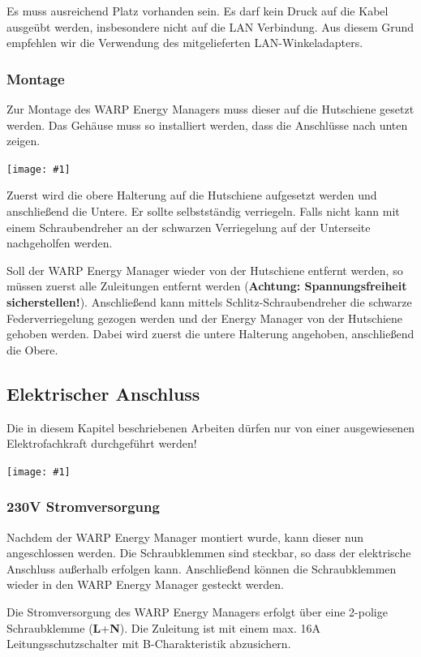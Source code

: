 \documentclass[a4paper,10pt]{article}
\newcommand{\hint}[1]{\begin{tcolorbox}[colback=boxgray,colframe=black,coltext=
white,title=Hinweis,left*=2mm,right*=2mm,boxsep=1mm,bottom=1mm,top=1mm]#1\end{tcolorbox}}
\newcommand{\gfx}[1]{\texttt{[image: \#1]}}
\begin{document}
\begin{multicols*}{2}
	Es muss ausreichend Platz vorhanden sein. Es darf kein Druck auf die Kabel
	ausgeübt werden, insbesondere nicht auf die LAN Verbindung. Aus diesem Grund
	empfehlen wir die Verwendung des mitgelieferten LAN-Winkeladapters.

	\subsubsection{Montage}
	Zur Montage des WARP Energy Managers muss dieser auf die Hutschiene
	gesetzt werden. Das Gehäuse muss so installiert werden, dass die Anschlüsse
	nach unten zeigen.

	\gfx{./img/wem_mounting.jpg}

	Zuerst wird die obere Halterung auf die Hutschiene aufgesetzt werden und anschließend
	die Untere. Er sollte selbstständig verriegeln. Falls nicht kann mit einem
	Schraubendreher an der schwarzen Verriegelung auf der Unterseite
	nachgeholfen werden.
	\par
	Soll der WARP Energy Manager wieder von der Hutschiene entfernt werden, so
	müssen zuerst alle Zuleitungen entfernt werden (\textbf{Achtung: Spannungsfreiheit
	sicherstellen!}). Anschließend kann mittels Schlitz-Schraubendreher die schwarze
	Federverriegelung gezogen werden und der Energy Manager von der Hutschiene
	gehoben werden. Dabei wird zuerst die untere Halterung angehoben,
	anschließend die Obere.

	\newpage
	\subsection{Elektrischer Anschluss}
	\hint{Die in diesem Kapitel beschriebenen Arbeiten dürfen nur von einer ausgewiesenen
		Elektrofachkraft durchgeführt werden!}

	\gfx{./img/wem_connections.jpg}


	\subsubsection{230V Stromversorgung}
	Nachdem der WARP Energy Manager montiert wurde, kann dieser nun angeschlossen werden.
	Die Schraubklemmen sind steckbar, so dass der elektrische Anschluss
	außerhalb erfolgen kann. Anschließend können die Schraubklemmen wieder in
	den WARP Energy Manager gesteckt werden.

	Die Stromversorgung des WARP Energy Managers erfolgt über eine 2-polige
	Schraubklemme (\textbf{L}+\textbf{N}). Die Zuleitung ist mit einem max. 16A Leitungsschutzschalter mit
	B-Charakteristik abzusichern.


\end{multicols*}
\end{document}
